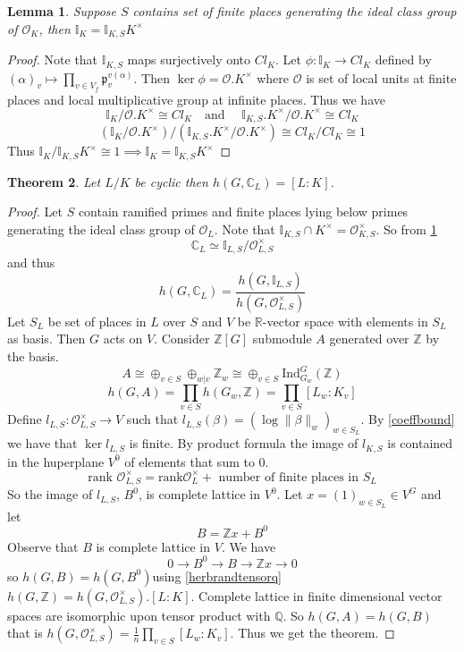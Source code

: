 \documentclass[twoside, 12pt]{iiser-thesis}
\newtheorem{thm}{Theorem}[section]
\newtheorem{lem}[thm]{ Lemma}
\newcommand{\R}{\mathbb{R}}
\newcommand{\Z}{\mathbb{Z}}
\newcommand{\C}{\mathbb{C}}
\newcommand{\Q}{\mathbb{Q}}
\newcommand{\I}{\mathbb{I}}
\newcommand{\Ol}{\mathcal{O}}
\newcommand{\x}{\times}
\begin{document}
\begin{lem}\label{idelefield}
Suppose $S$ contains set of finite places generating the ideal class group of $\Ol _K$, then $\I _K = \I _{K,S} K ^\x$
\end{lem}
\begin{proof}
Note that $\I _{K,S}$ maps surjectively onto $Cl_K$. Let $\phi : \I _K \rightarrow Cl _K $ defined by $(\alpha )_v \mapsto \prod _{v \in V_f} \mathfrak p _v ^{v(\alpha )} $. Then $\ker \phi = \Ol . K^\x$ where $\Ol $ is set of local units at finite places and local multiplicative group at infinite places. Thus we have \[\I _K /\Ol . K^\x \cong Cl _K \quad \text {and } \quad \I _{K,S}. K^\x/ \Ol . K^\x \cong Cl_K \]  \[ (\I _K / \Ol . K^\x )/(\I _{K,S} . K^\x/\Ol . K^ \x ) \cong Cl_K /Cl_K  \cong 1 \] Thus $\I _K / \I _{K,S} K ^\x \cong 1 \implies \I _K =\I _{K,S} K^\x $
\end{proof}
\begin{thm}
Let $L/K$ be cyclic then $h(G,\C _L) =[L:K]$.
\end{thm}
\begin{proof}
Let $S$ contain ramified primes and finite places lying below primes generating the ideal class group of $\Ol _L$. 
Note that $\I _{K,S} \cap K^ \x = \Ol _{K,S} ^\x$. So from \cref{idelefield}
\[ \C _L \simeq \I _{L,S} / \Ol _{L,S} ^\x \]
and thus \[h(G, \C _L) = \frac{h(G, \I _{L,S})}{h(G,\Ol _{L,S}^\x)} \]
Let $S_L$ be set of places in $L$ over $S$ and $V$ be $\R$-vector space with elements in $S_L$ as basis. Then $G$ acts on $V$. Consider $\Z [G]$ submodule $A$ generated over $\Z$ by the basis. \[ A \cong \oplus _{v \in S} \oplus _{w|v} \Z _w \cong \oplus _{v \in S} \text{Ind} ^G _{G_w} (\Z) \] \[h(G,A) = \prod _ {v\in S} h(G_w, \Z ) =  \prod _{v \in S} [L_w : K_v]\]
Define $l_{L,S} : \Ol ^\x _{L,S} \rightarrow V $ such that $l_{L,S} (\beta ) = ( \log \| \beta \| _w ) _{w \in S_L } $. By \cref{coeffbound} we have that $\ker l_{L,S}$ is finite.
\newline
By product formula the image of $l_{K,S}$ is contained in the huperplane $V^0$ of elements that sum to $0$. 
\[ \text{rank } \Ol ^\x _{L,S} = \text{rank} \Ol _L^\x + \text{ number of finite places in } S_L \] 
So the image of $l_{L,S}$, $B^0$, is complete lattice in $V^0$. 
\newline
Let $x = (1) _{w \in S_L} \in V ^G$ and let \[ B = \Z x + B^0 \] Observe that $B$ is complete lattice in $V$. We have \[ 0 \rightarrow B^0 \rightarrow B \rightarrow \Z x \rightarrow 0\]  so $h(G,B)=h(G, B^0)$using \cref{herbrandtensorq}  $h(G,\Z ) = h(G, \Ol _{L,S}^\x).[L:K]$.  
\newline
Complete lattice in finite dimensional vector spaces are isomorphic upon tensor product with $\Q$. So $h(G,A) =h(G,B)$ that is $h(G, \Ol _{L,S} ^\x ) = \frac{1}{n} \prod _{v \in S} [L_w : K_v]$.
Thus we get the theorem.

\end{proof}
\end{document}
